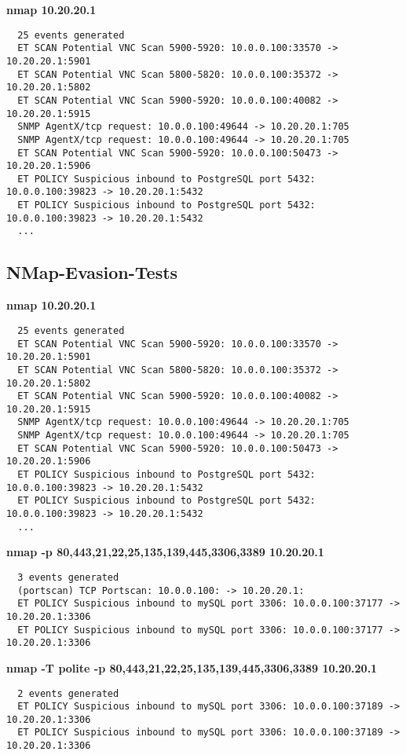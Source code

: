 \textbf{nmap 10.20.20.1}

\begin{verbatim}
  25 events generated
  ET SCAN Potential VNC Scan 5900-5920: 10.0.0.100:33570 -> 10.20.20.1:5901
  ET SCAN Potential VNC Scan 5800-5820: 10.0.0.100:35372 -> 10.20.20.1:5802
  ET SCAN Potential VNC Scan 5900-5920: 10.0.0.100:40082 -> 10.20.20.1:5915
  SNMP AgentX/tcp request: 10.0.0.100:49644 -> 10.20.20.1:705
  SNMP AgentX/tcp request: 10.0.0.100:49644 -> 10.20.20.1:705
  ET SCAN Potential VNC Scan 5900-5920: 10.0.0.100:50473 -> 10.20.20.1:5906
  ET POLICY Suspicious inbound to PostgreSQL port 5432: 10.0.0.100:39823 -> 10.20.20.1:5432
  ET POLICY Suspicious inbound to PostgreSQL port 5432: 10.0.0.100:39823 -> 10.20.20.1:5432
  ...
\end{verbatim}

\subsection{NMap-Evasion-Tests}
\label{nmap-evasion-tests}
\textbf{nmap 10.20.20.1}

\begin{verbatim}
  25 events generated
  ET SCAN Potential VNC Scan 5900-5920: 10.0.0.100:33570 -> 10.20.20.1:5901
  ET SCAN Potential VNC Scan 5800-5820: 10.0.0.100:35372 -> 10.20.20.1:5802
  ET SCAN Potential VNC Scan 5900-5920: 10.0.0.100:40082 -> 10.20.20.1:5915
  SNMP AgentX/tcp request: 10.0.0.100:49644 -> 10.20.20.1:705
  SNMP AgentX/tcp request: 10.0.0.100:49644 -> 10.20.20.1:705
  ET SCAN Potential VNC Scan 5900-5920: 10.0.0.100:50473 -> 10.20.20.1:5906
  ET POLICY Suspicious inbound to PostgreSQL port 5432: 10.0.0.100:39823 -> 10.20.20.1:5432
  ET POLICY Suspicious inbound to PostgreSQL port 5432: 10.0.0.100:39823 -> 10.20.20.1:5432
  ...
\end{verbatim}

\textbf{nmap -p 80,443,21,22,25,135,139,445,3306,3389 10.20.20.1}

\begin{verbatim}
  3 events generated
  (portscan) TCP Portscan: 10.0.0.100: -> 10.20.20.1:
  ET POLICY Suspicious inbound to mySQL port 3306: 10.0.0.100:37177 -> 10.20.20.1:3306
  ET POLICY Suspicious inbound to mySQL port 3306: 10.0.0.100:37177 -> 10.20.20.1:3306
\end{verbatim}

\textbf{nmap -T polite -p 80,443,21,22,25,135,139,445,3306,3389 10.20.20.1}

\begin{verbatim}
  2 events generated
  ET POLICY Suspicious inbound to mySQL port 3306: 10.0.0.100:37189 -> 10.20.20.1:3306
  ET POLICY Suspicious inbound to mySQL port 3306: 10.0.0.100:37189 -> 10.20.20.1:3306
\end{verbatim}

